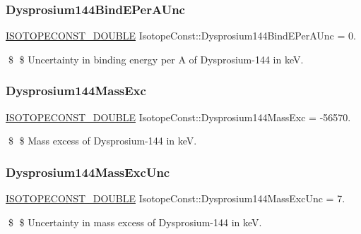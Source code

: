 \subsubsection{\texorpdfstring{Dysprosium144\+Bind\+E\+Per\+A\+Unc}{Dysprosium144BindEPerAUnc}}
{\footnotesize\ttfamily \mbox{\hyperlink{group___isotope_const-_macros_ga8f45a7272ce02c0b4c65c44636ed719a}{I\+S\+O\+T\+O\+P\+E\+C\+O\+N\+S\+T\+\_\+\+D\+O\+U\+B\+LE}} Isotope\+Const\+::\+Dysprosium144\+Bind\+E\+Per\+A\+Unc = 0.}

\$ \$ Uncertainty in binding energy per A of Dysprosium-\/144 in keV. \mbox{\label{group___isotope_const-_dysprosium-_dy144_gaacbc74c6591b68b114c99339187f8a3a}} 
\subsubsection{\texorpdfstring{Dysprosium144\+Mass\+Exc}{Dysprosium144MassExc}}
{\footnotesize\ttfamily \mbox{\hyperlink{group___isotope_const-_macros_ga8f45a7272ce02c0b4c65c44636ed719a}{I\+S\+O\+T\+O\+P\+E\+C\+O\+N\+S\+T\+\_\+\+D\+O\+U\+B\+LE}} Isotope\+Const\+::\+Dysprosium144\+Mass\+Exc = -\/56570.}

\$ \$ Mass excess of Dysprosium-\/144 in keV. \mbox{\label{group___isotope_const-_dysprosium-_dy144_ga1ef1e03ad42756d880db389bfe5aabc4}} 
\subsubsection{\texorpdfstring{Dysprosium144\+Mass\+Exc\+Unc}{Dysprosium144MassExcUnc}}
{\footnotesize\ttfamily \mbox{\hyperlink{group___isotope_const-_macros_ga8f45a7272ce02c0b4c65c44636ed719a}{I\+S\+O\+T\+O\+P\+E\+C\+O\+N\+S\+T\+\_\+\+D\+O\+U\+B\+LE}} Isotope\+Const\+::\+Dysprosium144\+Mass\+Exc\+Unc = 7.}

\$ \$ Uncertainty in mass excess of Dysprosium-\/144 in keV. \mbox{\label{group___isotope_const-_dysprosium-_dy144_gacc3d80b8fcee15009063a522ef0c15e5}} 

